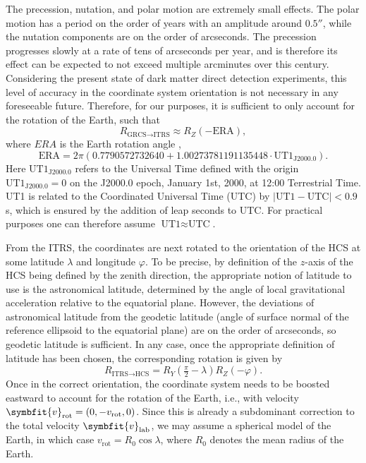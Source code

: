 \documentclass[b5paper, 10pt, twoside]{book}
\renewcommand{\vec}[1]{\symbfit{#1}}
\begin{document}
The precession, nutation, and polar motion are extremely small effects. The polar motion has a period on the order of years with an amplitude around $0.5''$, while the nutation components are on the order of arcseconds. The precession progresses slowly at a rate of tens of arcseconds per year, and is therefore its effect can be expected to not exceed multiple arcminutes over this century. Considering the present state of dark matter direct detection experiments, this level of accuracy in the coordinate system orientation is not necessary in any foreseeable future. Therefore, for our purposes, it is sufficient to only account for the rotation of the Earth, such that
\begin{equation}
R_{\text{GRCS}\rightarrow\text{ITRS}}\approx R_Z(-\text{ERA}),
\end{equation}
where $ERA$ is the Earth rotation angle \parencite{LuzumPetit2010},
\begin{equation}
\text{ERA}=2\pi(0.7790572732640+1.00273781191135448\cdot\text{UT1}_\text{J2000.0}).
\end{equation}
Here $\text{UT1}_\text{J2000.0}$ refers to the Universal Time defined with the origin $\text{UT1}_\text{J2000.0}=0$ on the J2000.0 epoch, January 1st, 2000, at 12:00 Terrestrial Time. UT1 is related to the Coordinated Universal Time (UTC) by $|\text{UT1}-\text{UTC}|<0.9$ s, which is ensured by the addition of leap seconds to UTC. For practical purposes one can therefore assume $\text{UT1}\approx\text{UTC}$.

From the ITRS, the coordinates are next rotated to the orientation of the HCS at some latitude $\lambda$ and longitude $\varphi$. To be precise, by definition of the $z$-axis of the HCS being defined by the zenith direction, the appropriate notion of latitude to use is the astronomical latitude, determined by the angle of local gravitational acceleration relative to the equatorial plane. However, the deviations of astronomical latitude from the geodetic latitude (angle of surface normal of the reference ellipsoid to the equatorial plane) are on the order of arcseconds, so geodetic latitude is sufficient. In any case, once the appropriate definition of latitude has been chosen, the corresponding rotation is given by
\begin{equation}
R_{\text{ITRS}\rightarrow\text{HCS}}=R_Y(\tfrac{\pi}{2}-\lambda)R_Z(-\varphi).
\end{equation}
Once in the correct orientation, the coordinate system needs to be boosted eastward to account for the rotation of the Earth, i.e., with velocity $\vec{v}_\text{rot}=(0,-v_\text{rot},0)$. Since this is already a subdominant correction to the total velocity $\vec{v}_\text{lab}$, we may assume a spherical model of the Earth, in which case $v_\text{rot}=R_0\cos\lambda$, where $R_0$ denotes the mean radius of the Earth.
\end{document}
